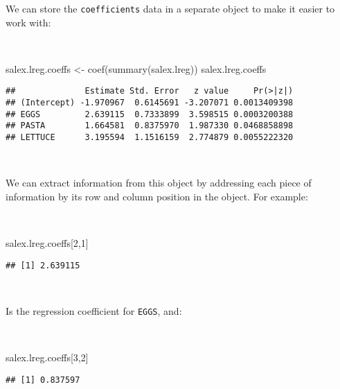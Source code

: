 \documentclass[
  12pt,
  a4paper]{book}
\newenvironment{Shaded}{\begin{snugshade}}{\end{snugshade}}
\newcommand{\DecValTok}[1]{\textcolor[rgb]{0.00,0.00,0.81}{#1}}
\newcommand{\FunctionTok}[1]{\textcolor[rgb]{0.00,0.00,0.00}{#1}}
\newcommand{\NormalTok}[1]{#1}
\newcommand{\OtherTok}[1]{\textcolor[rgb]{0.56,0.35,0.01}{#1}}
\begin{document}
\newpage

We can store the \texttt{coefficients} data in a separate object to make it easier to work with:

~

\begin{Shaded}
\begin{Highlighting}[]
\NormalTok{salex.lreg.coeffs }\OtherTok{\textless{}{-}} \FunctionTok{coef}\NormalTok{(}\FunctionTok{summary}\NormalTok{(salex.lreg))}
\NormalTok{salex.lreg.coeffs}
\end{Highlighting}
\end{Shaded}

\begin{verbatim}
##              Estimate Std. Error   z value     Pr(>|z|)
## (Intercept) -1.970967  0.6145691 -3.207071 0.0013409398
## EGGS         2.639115  0.7333899  3.598515 0.0003200388
## PASTA        1.664581  0.8375970  1.987330 0.0468858898
## LETTUCE      3.195594  1.1516159  2.774879 0.0055222320
\end{verbatim}

~

We can extract information from this object by addressing each piece of information by its row and column position in the object. For example:

~

\begin{Shaded}
\begin{Highlighting}[]
\NormalTok{salex.lreg.coeffs[}\DecValTok{2}\NormalTok{,}\DecValTok{1}\NormalTok{]}
\end{Highlighting}
\end{Shaded}

\begin{verbatim}
## [1] 2.639115
\end{verbatim}

~

Is the regression coefficient for \texttt{EGGS}, and:

~

\begin{Shaded}
\begin{Highlighting}[]
\NormalTok{salex.lreg.coeffs[}\DecValTok{3}\NormalTok{,}\DecValTok{2}\NormalTok{]}
\end{Highlighting}
\end{Shaded}

\begin{verbatim}
## [1] 0.837597
\end{verbatim}
\end{document}

